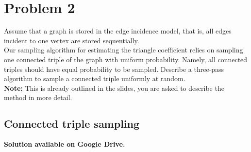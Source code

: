
\section{Problem 2}

Assume that a graph is stored in the edge incidence model, that is, all edges incident to one vertex are stored sequentially.\\
Our sampling algorithm for estimating the triangle coefficient relies on sampling one connected triple of the graph with uniform probability. Namely, all connected triples should have equal probability to be sampled. Describe a three-pass algorithm to sample a connected triple uniformly at random.\\
\textbf{Note:} This is already outlined in the slides, you are asked to describe the method in more detail.

\subsection{Connected triple sampling}

\textbf{Solution available on Google Drive.}
